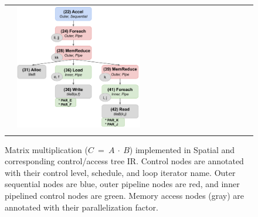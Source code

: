 \begin{figure}
\begin{tabular}{cm{}m{}}
{\hspace{10pt}\usebox{\gemm}} &
{\includegraphics[width=0.55\textwidth]{5-compiler/figs/ctrltree.pdf}} \\
{\parbox{0.4\textwidth}{}} &
{\parbox{0.6\textwidth}{}}
\end{tabular} %
\caption{Matrix multiplication ($C$~=~$A~\cdot~B$) implemented in Spatial and corresponding control/access tree IR. Control nodes are annotated with their control level, schedule, and loop iterator name. Outer sequential nodes are blue, outer pipeline nodes are red, and inner pipelined control nodes are green. Memory access nodes (gray) are annotated with their parallelization factor.}
\label{fig:matmult}
\end{figure}
